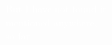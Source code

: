 \documentclass[preview,convert={density=600,outext=.png,command=\unexpanded{ {\convertexe\space -density \density\space\infile\space \ifx\size\empty\else -resize \size\fi\space -quality 90 -trim +repage -background "rgba(50,50,50,0.5)" -bordercolor "rgba(50,50,50,0.5)" -border 25 -flatten \outfile} } }]{standalone}
\begin{document}
\begin{center}
\textcolor{white}{
But I have not found it \\
mentioned anywhere, \\
so far \\}
\end{center}
\end{document}
